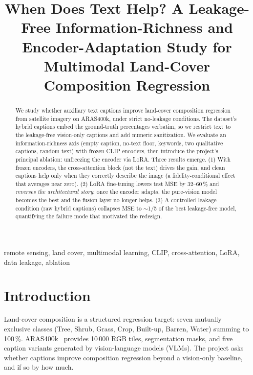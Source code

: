 \documentclass[conference]{IEEEtran}
\begin{document}
\title{When Does Text Help? A Leakage-Free Information-Richness and
Encoder-Adaptation Study for Multimodal Land-Cover Composition Regression}

\author{
}

\maketitle

\begin{abstract}
We study whether auxiliary text captions improve land-cover composition
regression from satellite imagery on ARAS400k, under strict no-leakage
conditions. The dataset's hybrid captions embed the ground-truth percentages
verbatim, so we restrict text to the leakage-free vision-only captions and add
numeric sanitization. We evaluate an information-richness axis (empty caption,
no-text floor, keywords, two qualitative captions, random text) with frozen
CLIP encoders, then introduce the project's principal ablation: unfreezing the
encoder via LoRA. Three results emerge. (1) With frozen encoders, the
cross-attention block (not the text) drives the gain, and clean captions
help only when they correctly describe the image (a fidelity-conditional effect
that averages near zero). (2) LoRA fine-tuning lowers test MSE by 32--60\,\%
and \emph{reverses the architectural story}: once the encoder adapts, the
pure-vision model becomes the best and the fusion layer no longer helps.
(3) A controlled leakage condition (raw hybrid captions) collapses MSE to
$\sim$1/5 of the best leakage-free model, quantifying the failure mode that
motivated the redesign.
\end{abstract}

\begin{IEEEkeywords}
remote sensing, land cover, multimodal learning, CLIP, cross-attention,
LoRA, data leakage, ablation
\end{IEEEkeywords}

\section{Introduction}

Land-cover composition is a structured regression target: seven mutually
exclusive classes (Tree, Shrub, Grass, Crop, Built-up, Barren, Water) summing
to 100\,\%. ARAS400k~\cite{aras400k} provides 10\,000 RGB tiles, segmentation
masks, and five caption variants generated by vision-language models (VLMs).
The project asks whether captions improve composition regression beyond a
vision-only baseline, and if so by how much.
\end{document}
